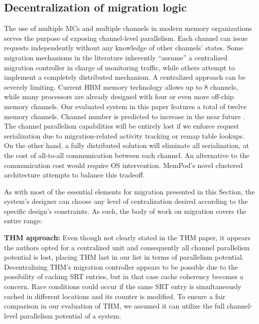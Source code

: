 
\subsection{Decentralization of migration logic}

The use of multiple MCs and multiple channels in modern memory organizations serves the purpose of exposing channel-level parallelism. Each channel can issue requests independently without any knowledge of other channels' states. Some migration mechanisms in the literature inherently ``assume'' a centralized migration controller in charge of monitoring traffic, while others attempt to implement a completely distributed mechanism. A centralized approach can be severely limiting. Current HBM memory technology allows up to 8 channels, while many processors are already designed with four or even more off-chip memory channels. Our evaluated system in this paper features a total of twelve memory channels. Channel number is predicted to increase in the near future \TODO{[cite]}. The channel parallelism capabilities will be entirely lost if we enforce request serialization due to migration-related activity tracking or remap table lookups. On the other hand, a fully distributed solution will eliminate all serialization, at the cost of all-to-all communication between each channel. An alternative to the communication cost would require OS intervention. MemPod's novel clustered architecture attempts to balance this tradeoff. 

As with most of the essential elements for migration presented in this Section, the system's designer can choose any level of centralization desired according to the specific design's constraints. As such, the body of work on migration covers the entire range:

	\textbf{THM approach:} Even though not clearly stated in the THM paper, it appears the authors opted for a centralized unit and consequently all channel parallelism potential is lost, placing THM last in our list in terms of parallelism potential. Decentralizing THM's migration controller appears to be possible due to the possibility of caching SRT entries, but in that case cache coherency becomes a concern. Race conditions could occur if the same SRT entry is simultaneously cached in different locations and its counter is modified. To ensure a fair comparison in our evaluation of THM, we assumed it can utilize the full channel-level parallelism potential of a system. 

